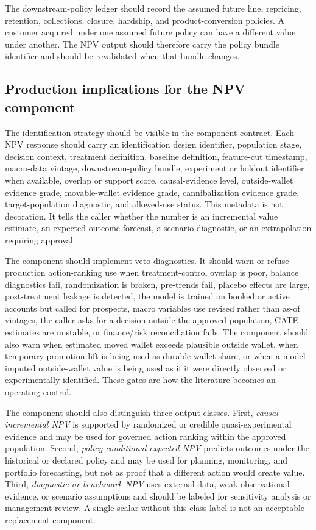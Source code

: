 \documentclass[11pt]{article}
\newcommand{\1}{\mathbf{1}}
\begin{document}
The downstream-policy ledger should record the assumed future line,
repricing, retention, collections, closure, hardship, and product-conversion
policies. A customer acquired under one assumed future policy can have a
different value under another. The NPV output should therefore carry the policy
bundle identifier and should be revalidated when that bundle changes.

\subsection{Production implications for the NPV component}

The identification strategy should be visible in the component contract. Each
NPV response should carry an identification design identifier, population
stage, decision context, treatment definition, baseline definition, feature-cut
timestamp, macro-data vintage, downstream-policy bundle, experiment or holdout
identifier when available, overlap or support score, causal-evidence level,
outside-wallet evidence grade, movable-wallet evidence grade, cannibalization
evidence grade, target-population diagnostic, and allowed-use status. This
metadata is not decoration. It tells the caller whether the number is an
incremental value estimate, an expected-outcome forecast, a scenario diagnostic,
or an extrapolation requiring approval.

The component should implement veto diagnostics. It should warn or refuse
production action-ranking use when treatment-control overlap is poor, balance
diagnostics fail, randomization is broken, pre-trends fail, placebo effects are
large, post-treatment leakage is detected, the model is trained on booked or
active accounts but called for prospects, macro variables use revised rather
than as-of vintages, the caller asks for a decision outside the approved
population, CATE estimates are unstable, or finance/risk reconciliation fails.
The component should also warn when estimated moved wallet exceeds plausible
outside wallet, when temporary promotion lift is being used as durable wallet
share, or when a model-imputed outside-wallet value is being used as if it were
directly observed or experimentally identified. These gates are how the
literature becomes an operating control.

The component should also distinguish three output classes. First,
\emph{causal incremental NPV} is supported by randomized or credible
quasi-experimental evidence and may be used for governed action ranking within
the approved population. Second, \emph{policy-conditional expected NPV}
predicts outcomes under the historical or declared policy and may be used for
planning, monitoring, and portfolio forecasting, but not as proof that a
different action would create value. Third, \emph{diagnostic or benchmark NPV}
uses external data, weak observational evidence, or scenario assumptions and
should be labeled for sensitivity analysis or management review. A single
scalar without this class label is not an acceptable replacement component.
\end{document}
